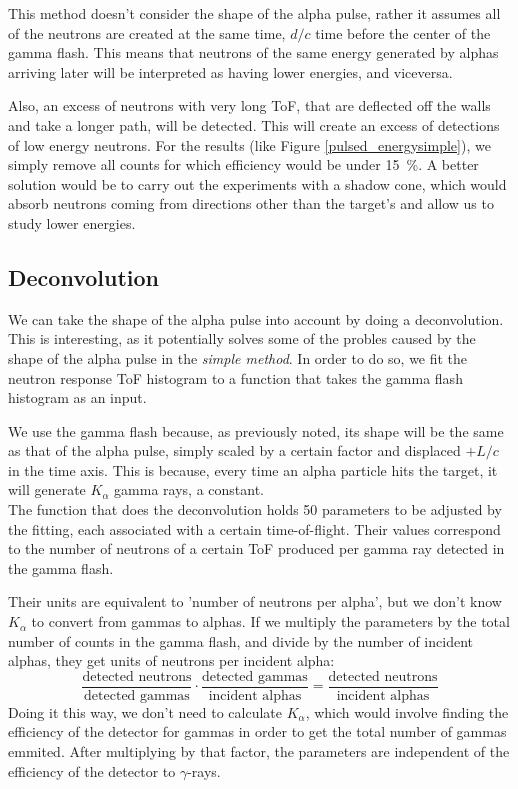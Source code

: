 \documentclass[a4paper,12pt]{report}
\begin{document}
This method doesn't consider the shape of the alpha pulse, rather it assumes all of the neutrons are created at the same time, $d/c$ time before the center of the gamma flash.
This means that neutrons of the same energy generated by alphas arriving later will be interpreted as having lower energies, and viceversa.

Also, an excess of neutrons with very long ToF, that are deflected off the walls and take a longer path, will be detected.
This will create an excess of detections of low energy neutrons.
For the results (like Figure \ref{pulsed_energysimple}), we simply remove all counts for which efficiency would be under \qty{15}{\percent}.
A better solution would be to carry out the experiments with a shadow cone, which would absorb neutrons coming from directions other than the target's and allow us to study lower energies.

\subsection{Deconvolution}
We can take the shape of the alpha pulse into account by doing a deconvolution.
This is interesting, as it potentially solves some of the probles caused by the shape of the alpha pulse in the \textit{simple method}.
In order to do so, we fit the neutron response ToF histogram to a function that takes the gamma flash histogram as an input.

We use the gamma flash because, as previously noted, its shape will be the same as that of the alpha pulse, simply scaled by a certain factor and displaced $+L/c$ in the time axis.
This is because, every time an alpha particle hits the target, it will generate $K_\alpha$ gamma rays, a constant.
\\

The function that does the deconvolution holds \num{50} parameters to be adjusted by the fitting, each associated with a certain time-of-flight.
Their values correspond to the number of neutrons of a certain ToF produced per gamma ray detected in the gamma flash.

Their units are equivalent to 'number of neutrons per alpha', but we don't know $K_\alpha$ to convert from gammas to alphas.
If we multiply the parameters by the total number of counts in the gamma flash, and divide by the number of incident alphas, they get units of neutrons per incident alpha:
\begin{equation}
	\frac{\text{detected neutrons}}{\text{detected gammas}}\cdot \frac{\text{detected gammas}}{\text{incident alphas}} = \frac{\text{detected neutrons}}{\text{incident alphas}}
\end{equation}
Doing it this way, we don't need to calculate $K_\alpha$, which would involve finding the efficiency of the detector for gammas in order to get the total number of gammas emmited.
After multiplying by that factor, the parameters are independent of the efficiency of the detector to $\gamma$-rays.
\\
\end{document}
